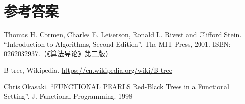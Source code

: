 \documentclass[b5paper]{ctexart}
\begin{document}
\ifx\wholebook\relax \else
\section{参考答案}

\shipoutAnswer

\begin{thebibliography}{99}

Thomas H. Cormen, Charles E. Leiserson, Ronald L. Rivest and Clifford Stein. ``Introduction to Algorithms, Second Edition''. The MIT Press, 2001. ISBN: 0262032937.（《算法导论》第二版）

B-tree, Wikipedia. \url{https://en.wikipedia.org/wiki/B-tree}

Chris Okasaki. ``FUNCTIONAL PEARLS Red-Black Trees in a Functional Setting''. J. Functional Programming. 1998

\end{thebibliography}
\end{document}
